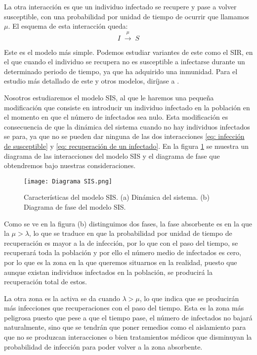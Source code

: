 La otra interacción es que un individuo infectado se recupere y pase a volver susceptible, con una probabilidad por unidad de tiempo de ocurrir 
que llamamos $\mu$. El esquema de esta interacción queda:
\begin{equation}
    I \; \xrightarrow{\mu}\;S
    \label{eq: recuperación de un infectado}
\end{equation}

Este es el modelo más simple. Podemos estudiar variantes de este como el SIR, en el que cuando el individuo se recupera no es susceptible 
a infectarse durante un determinado periodo de tiempo, ya que ha adquirido una inmunidad. Para el estudio más detallado de este y otros modelos, diríjase a \cite{Satorras}.

Nosotros estudiaremos el modelo SIS, al que le haremos una pequeña modificación que consiste en introducir un individuo infectado en la población
en el momento en que el número de infectados sea nulo. Esta modificación es consecuencia de que la dinámica del sistema cuando no hay individuos 
infectados se para, ya que no se pueden dar ninguna de las dos interacciones \ref{eq: infección de susceptible} y
\ref{eq: recuperación de un infectado}. En la figura \ref{f:diagrama modelo sis} se muestra un diagrama de las interacciones 
del modelo SIS y el diagrama de fase que obtendremos bajo nuestras consideraciones.

\begin{figure}[H]
    \centering
    \texttt{[image: Diagrama SIS.png]}
    \caption{Características del modelo SIS. (a) Dinámica del sistema. (b) Diagrama de fase del modelo SIS.}
    \label{f:diagrama modelo sis}
\end{figure}

Como se ve en la figura (b) distinguimos dos fases, la fase absorbente es en la que la $\mu > \lambda$, lo que se traduce en que la probabilidad 
por unidad de tiempo de recuperación es mayor a la de infección, por lo que con el paso del tiempo, se recuperará toda la población y por ello
el número medio de infectados es cero, por lo que es la zona en la que queremos situarnos en la realidad, puesto que aunque existan individuos infectados
en la población, se producirá la recuperación total de estos.

La otra zona es la activa se da cuando $\lambda > \mu$, lo que indica que se producirán más infecciones que recuperaciones con el paso del tiempo. 
Esta es la zona más peligrosa puesto que pese a que el tiempo pase, el número de infectados no bajará naturalmente, sino que se tendrán que poner remedios como el aislamiento para que no se produzcan interacciones o bien tratamientos
médicos que disminuyan la probabilidad de infección para poder volver a la zona absorbente.

